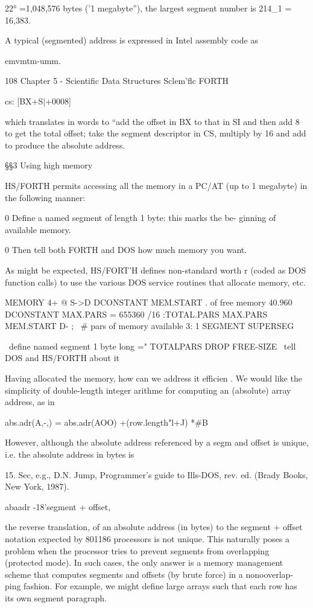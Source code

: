 {22° =1,048,576 bytes ('1 megabyte”),
the largest segment number is 214_1 = 16,383.

A typical (segmented) address is expressed in Intel assembly code
as

emvmtm-umm.

108 Chapter 5 - Scientific Data Structures Sclem'flc FORTH

cs: [BX+S|+0008]

which translates in words to “add the offset in BX to that in SI
and then add 8 to get the total offset; take the segment descriptor
in CS, multiply by 16 and add to produce the absolute address.

§§3 Using high memory

HS/FORTH permits accessing all the memory in a PC/AT (up
to 1 megabyte) in the following manner:

0 Define a named segment of length 1 byte: this marks the be-
ginning of available memory.

0 Then tell both FORTH and DOS how much memory you want.

 

As might be expected, HS/FORT'H defines non-standard worth r
(coded as DOS function calls) to use the various DOS service
routines that allocate memory, etc.

MEMORY 4+ @ S->D
DCONSTANT MEM.START \beg. of free memory
40.960 DCONSTANT MAX.PARS
 = 655360 /16
:TOTAL.PARS MAX.PARS MEM.START D- ;
\ # pars of memory available 3:
1 SEGMENT SUPERSEG }
\ define named segment 1 byte long ="
TOTALPARS DROP FREE-SIZE
\ tell DOS and HS/FORTH about it

   
 
    
  

Having allocated the memory, how can we address it efficien .
We would like the simplicity of double-length integer arithme
for computing an (absolute) array address, as in

abs.adr(A,-,) = abs.adr(AOO) +(row.length"l+J) *#B

However, although the absolute address referenced by a segm
and offset is unique, i.e. the absolute address in bytes is

 

15. Sec, e.g., D.N. Jump, Programmer’s guide to Ills-DOS, rev. ed. (Brady Books, New York, 1987).

abaadr -18'segment + offset,

the reverse translation, of an absolute address (in bytes) to the
segment + offset notation expected by 801186 processors is not
unique. This naturally poses a problem when the processor tries
to prevent segments from overlapping (protected mode). In such
cases, the only answer is a memory management scheme that
computes segments and offsets (by brute force) in a nonooverlap-
ping fashion. For example, we might define large arrays such that
each row has its own segment paragraph.

